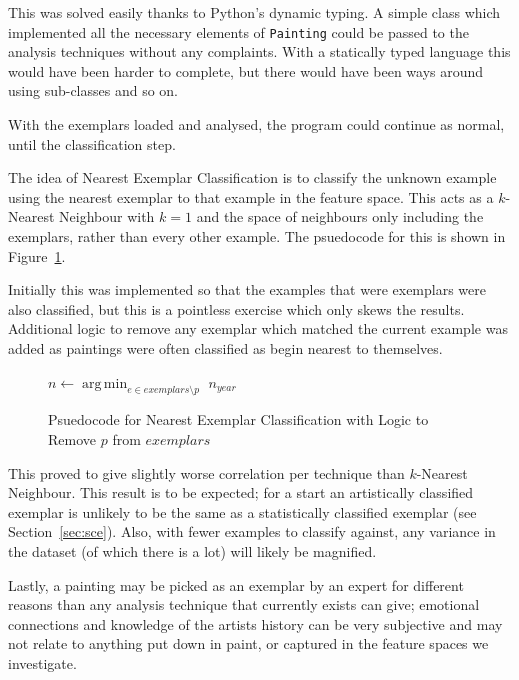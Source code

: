 This was solved easily thanks to Python's dynamic typing. A simple class which implemented all the
necessary elements of \texttt{Painting} could be passed to the analysis techniques without any
complaints. With a statically typed language this would have been harder to complete, but there
would have been ways around using sub-classes and so on.

With the exemplars loaded and analysed, the program could continue as normal, until the
classification step.

The idea of Nearest Exemplar Classification is to classify the unknown example using the nearest
exemplar to that example in the feature space. This acts as a $k$-Nearest Neighbour with $k=1$ and
the space of neighbours only including the exemplars, rather than every other example. The 
psuedocode for this is shown in Figure~\ref{fig:nec-psuedo}.

Initially this was implemented so that the examples that were exemplars were also classified, but
this is a pointless exercise which only skews the results. Additional logic to remove any exemplar
which matched the current example was added as paintings were often classified as begin nearest to
themselves.

\begin{figure}[h]
\begin{algorithmic}
\State $n \gets \operatorname*{arg\,min}_{e \in exemplars \setminus p}$ 
\State \Return $n_{year}$
\EndFunction
\end{algorithmic}
\caption[Psuedocode for Nearest Exemplar Classification with Added Logic]{Psuedocode for Nearest Exemplar Classification with Logic to Remove $p$ from $exemplars$}\label{fig:nec-psuedo}
\end{figure}

This proved to give slightly worse correlation per technique than $k$-Nearest Neighbour. This 
result is to be expected; for a start an artistically classified exemplar is unlikely to be the
same as a statistically classified exemplar (see Section~\ref{sec:sce}). Also, with fewer examples
to classify against, any variance in the dataset (of which there is a lot) will likely be 
magnified.

Lastly, a painting may be picked as an exemplar by an expert for different reasons than any
analysis technique that currently exists can give; emotional connections and knowledge of the
artists history can be very subjective and may not relate to anything put down in paint, or 
captured in the feature spaces we investigate.


